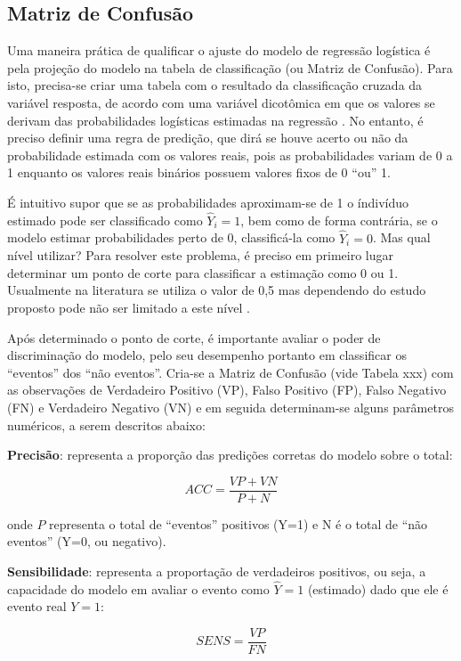 \documentclass[12pt,brazil,]{book}
\begin{document}
\hypertarget{matriz-de-confusao}{%
\subsection{Matriz de Confusão}\label{matriz-de-confusao}}

Uma maneira prática de qualificar o ajuste do modelo de regressão
logística é pela projeção do modelo na tabela de classificação (ou
Matriz de Confusão). Para isto, precisa-se criar uma tabela com o
resultado da classificação cruzada da variável resposta, de acordo com
uma variável dicotômica em que os valores se derivam das probabilidades
logísticas estimadas na regressão \autocite{Hosmer2000}. No entanto, é
preciso definir uma regra de predição, que dirá se houve acerto ou não
da probabilidade estimada com os valores reais, pois as probabilidades
variam de 0 a 1 enquanto os valores reais binários possuem valores fixos
de 0 ``ou'' 1.

É intuitivo supor que se as probabilidades aproximam-se de 1 o índivíduo
estimado pode ser classificado como \(\hat Y_i=1\), bem como de forma
contrária, se o modelo estimar probabilidades perto de 0, classificá-la
como \(\hat Y_i=0\). Mas qual nível utilizar? Para resolver este
problema, é preciso em primeiro lugar determinar um ponto de corte para
classificar a estimação como 0 ou 1. Usualmente na literatura se utiliza
o valor de 0,5 mas dependendo do estudo proposto pode não ser limitado a
este nível \autocite{Hosmer2000}.

Após determinado o ponto de corte, é importante avaliar o poder de
discriminação do modelo, pelo seu desempenho portanto em classificar os
``eventos'' dos ``não eventos''. Cria-se a Matriz de Confusão (vide
Tabela xxx) com as observações de Verdadeiro Positivo (VP), Falso
Positivo (FP), Falso Negativo (FN) e Verdadeiro Negativo (VN) e em
seguida determinam-se alguns parâmetros numéricos, a serem descritos
abaixo:

\textbf{Precisão}: representa a proporção das predições corretas do
modelo sobre o total:

\[
ACC=\frac{VP+VN}{P+N}
\]

onde \(P\) representa o total de ``eventos'' positivos (Y=1) e N é o
total de ``não eventos'' (Y=0, ou negativo).

\textbf{Sensibilidade}: representa a proportação de verdadeiros
positivos, ou seja, a capacidade do modelo em avaliar o evento como
\(\hat Y=1\) (estimado) dado que ele é evento real \(Y=1\):

\[
SENS=\frac{VP}{FN}
\]
\end{document}
